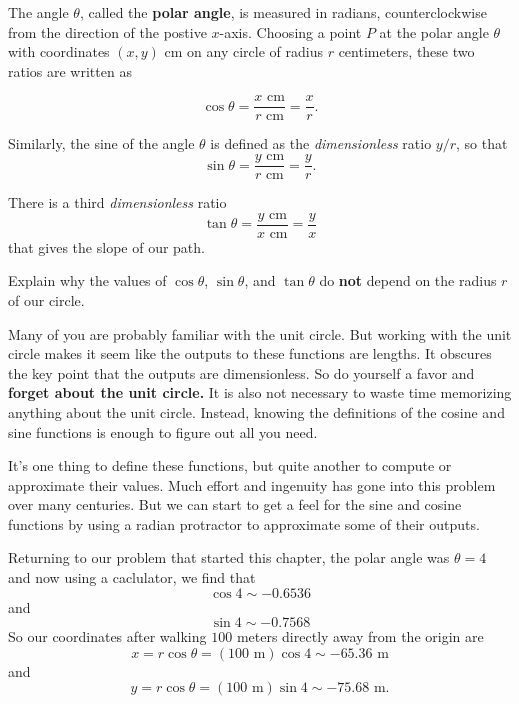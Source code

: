 \documentclass{ximera}
\begin{document}
\begin{question}
\begin{explanation}
The angle $\theta$, called the {\bf polar angle}, is measured in radians, counterclockwise from the direction of the postive $x$-axis. Choosing a point $P$ at the polar angle $\theta$ with coordinates $(x,y)$ cm on any circle of radius $r$ centimeters, these two ratios are written as

\[
   \cos \theta = \frac{x \text{ cm}}{r \text{ cm}} = \frac{x}{r} .
\]

Similarly, the sine of the angle $\theta$ is defined as the \emph{dimensionless} ratio $y/r$, so that
\[
   \sin \theta = \frac{y \text{ cm}}{r \text{ cm}} = \frac{y}{r} .
\]

There is a third \emph{dimensionless} ratio 
\[
  \tan \theta = \frac{y \text{ cm}}{x \text{ cm}} = \frac{y}{x}
\]
that gives the slope of our path. 
\end{explanation}

\end{question}



\begin{question} \label{Q1:Cosine}
Explain why the values of $\cos \theta$, $\sin\theta$, and $\tan\theta$ do {\bf not} depend on the radius $r$ of our circle. 
\end{question}



Many of you are probably familiar with the unit circle. But working with the unit circle makes it seem like the outputs to these functions are lengths. It obscures the key point that the outputs are dimensionless. So do yourself a favor and {\bf forget about the unit circle.} It is also not necessary to waste time memorizing anything about the unit circle. Instead, knowing the definitions of the cosine and sine functions is enough to figure out all you need.

It's one thing to define these functions, but quite another to compute or approximate their values. Much effort and ingenuity has gone into this problem over many centuries. But we can start to get a feel for the sine and cosine functions by using a radian protractor to approximate some of their outputs.

Returning to our problem that started this chapter, the polar angle was $\theta=4$ and now using a caclulator, we find that
\[
  \cos 4 \sim -0.6536
\]
and
\[
   \sin 4 \sim -0.7568
\]
So our coordinates after walking $100$ meters directly away from the origin are 
\[
     x = r\cos \theta = (100 \text{ m})\cos 4 \sim -65.36\text{ m}
\]
and
\[
     y = r\cos \theta = (100 \text{ m})\sin 4 \sim -75.68\text{ m} .
\]
\end{document}
